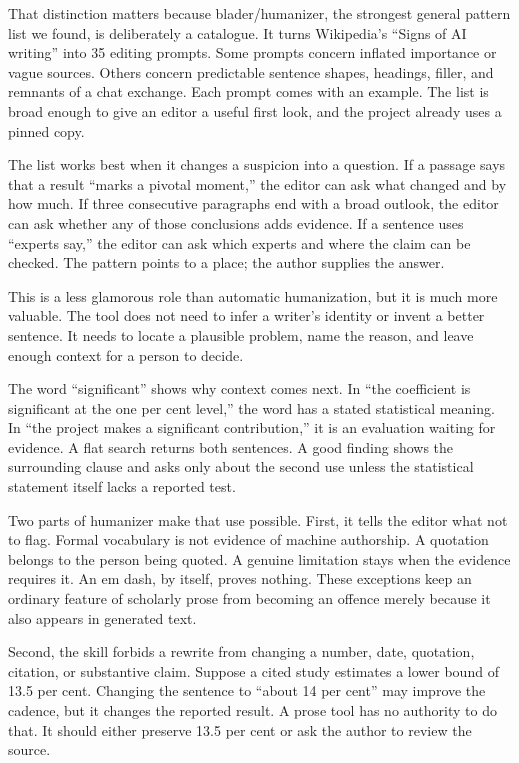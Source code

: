 That distinction matters because blader/humanizer, the strongest general
pattern list we found, is deliberately a catalogue. It turns Wikipedia's
``Signs of AI writing'' into 35 editing prompts. Some prompts concern inflated
importance or vague sources. Others concern predictable sentence shapes,
headings, filler, and remnants of a chat exchange. Each prompt comes with an
example. The list is broad enough to give an editor a useful first look, and
the project already uses a pinned copy.

The list works best when it changes a suspicion into a question. If a passage
says that a result ``marks a pivotal moment,'' the editor can ask what changed
and by how much. If three consecutive paragraphs end with a broad outlook, the
editor can ask whether any of those conclusions adds evidence. If a sentence
uses ``experts say,'' the editor can ask which experts and where the claim can
be checked. The pattern points to a place; the author supplies the answer.

\hvFigurePatternQuestion

This is a less glamorous role than automatic humanization, but it is much more
valuable. The tool does not need to infer a writer's identity or invent a
better sentence. It needs to locate a plausible problem, name the reason, and
leave enough context for a person to decide.

The word ``significant'' shows why context comes next. In ``the coefficient is
significant at the one per cent level,'' the word has a stated statistical
meaning. In ``the project makes a significant contribution,'' it is an
evaluation waiting for evidence. A flat search returns both sentences. A good
finding shows the surrounding clause and asks only about the second use unless
the statistical statement itself lacks a reported test.

Two parts of humanizer make that use possible. First, it tells the editor what
not to flag. Formal vocabulary is not evidence of machine authorship. A
quotation belongs to the person being quoted. A genuine limitation stays when
the evidence requires it. An em dash, by itself, proves nothing. These
exceptions keep an ordinary feature of scholarly prose from becoming an
offence merely because it also appears in generated text.

\Needspace{11cm}
Second, the skill forbids a rewrite from changing a number, date, quotation,
citation, or substantive claim. Suppose a cited study estimates a lower bound
of 13.5 per cent. Changing the sentence to ``about 14 per cent'' may improve
the cadence, but it changes the reported result. A prose tool has no authority
to do that. It should either preserve 13.5 per cent or ask the author to review
the source.


